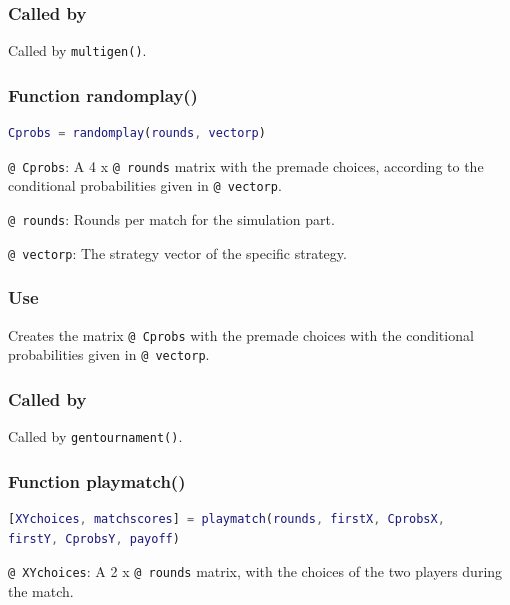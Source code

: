 \documentclass[12pt]{report}
\begin{document}
\subsubsection*{Called by}
Called by \texttt{multigen()}.








\subsubsection*{Function randomplay()}

\begin{lstlisting}[language=Matlab]
Cprobs = randomplay(rounds, vectorp)

\end{lstlisting}

\texttt{@ Cprobs}: A 4 x \texttt{@ rounds} matrix with the premade choices, according to the conditional probabilities given in \texttt{@ vectorp}. 

\texttt{@ rounds}: Rounds per match for the simulation part.

\texttt{@ vectorp}: The strategy vector of the specific strategy.

\subsubsection*{Use }
Creates the matrix \texttt{@ Cprobs} with the premade choices with the conditional probabilities given in \texttt{@ vectorp}.

\subsubsection*{Called by}
Called by \texttt{gentournament()}.








\subsubsection*{Function playmatch()}

\begin{lstlisting}[language=Matlab]
[XYchoices, matchscores] = playmatch(rounds, firstX, CprobsX,
firstY, CprobsY, payoff)

\end{lstlisting}

\texttt{@ XYchoices}: A 2 x \texttt{@ rounds} matrix, with the choices of the two players during the match.
\end{document}
